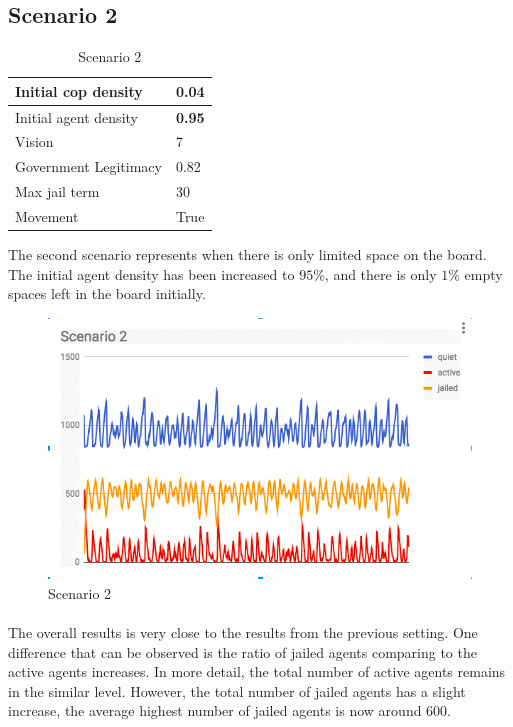 \documentclass[11pt]{article}
\begin{document}
      \subsection{Scenario 2}
      \begin{table}[ht]
        \begin{center}
          \begin{tabular}{|l|l|}
          \hline
            Initial cop density & 0.04 \\
          \hline
            Initial agent density & \textbf{0.95} \\
          \hline
            Vision & 7 \\
          \hline
            Government Legitimacy & 0.82 \\
          \hline
            Max jail term & 30 \\
          \hline
            Movement & True \\
          \hline
          \end{tabular}
          \caption{Scenario 2}\label{table2}
        \end{center}
      \end{table}
      The second scenario represents when there is only limited space on the board. 
      The initial agent density has been increased to $95\%$, and there is only
      $1\%$ empty spaces left in the board initially.
      \begin{figure}[h!]
        \includegraphics[width=\linewidth]{Scenario_2.png}
        \caption{Scenario 2}
        \label{fig:scenario}
      \end{figure}

      \paragraph{}
      The overall results is very close to the results from the previous setting.
      One difference that can be observed is the ratio of jailed agents comparing
      to the active agents increases. In more detail, the total number of active
      agents remains in the similar level. However, the total number of jailed agents
      has a slight increase, the average highest number of jailed agents is now
      around $600$.
\end{document}

